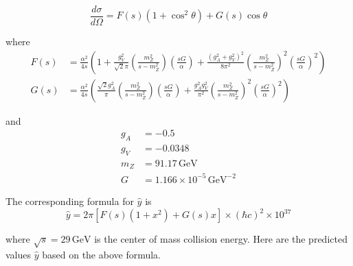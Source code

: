 \documentclass[12pt]{article}
\begin{document}
\begin{equation*}
\frac{d\sigma}{d\Omega}=F(s)(1+\cos^2\theta)+G(s)\cos\theta
\end{equation*}

\noindent
where
\begin{align*}
F(s)&=\frac{\alpha^2}{4s}
\left(
1+\frac{g_V^2}{\sqrt{2}\pi}\left(\frac{m_Z^2}{s-m_Z^2}\right)\left(\frac{sG}{\alpha}\right)
+\frac{(g_A^2+g_V^2)^2}{8\pi^2}\left(\frac{m_Z^2}{s-m_Z^2}\right)^2\left(\frac{sG}{\alpha}\right)^2
\right)
\\
G(s)&=\frac{\alpha^2}{4s}
\left(
\frac{\sqrt{2}g_A^2}{\pi}\left(\frac{m_Z^2}{s-m_Z^2}\right)\left(\frac{sG}{\alpha}\right)
+\frac{g_A^2g_V^2}{\pi^2}\left(\frac{m_Z^2}{s-m_Z^2}\right)^2\left(\frac{sG}{\alpha}\right)^2
\right)
\end{align*}

\noindent
and
\begin{align*}
g_A&=-0.5
\\
g_V&=-0.0348
\\
m_Z&=91.17\,\text{GeV}
\\
G&=1.166\times10^{-5}\,\text{GeV}^{-2}
\end{align*}

\noindent
The corresponding formula for $\hat{y}$ is
\begin{equation*}
\hat{y}=2\pi\left[F(s)(1+x^2)+G(s)x\right]\times(\hbar c)^2\times10^{37}
\end{equation*}

\noindent
where $\sqrt{s}=29\,\text{GeV}$ is the center of mass collision energy.
Here are the predicted values $\hat{y}$ based on the above formula.
\end{document}
